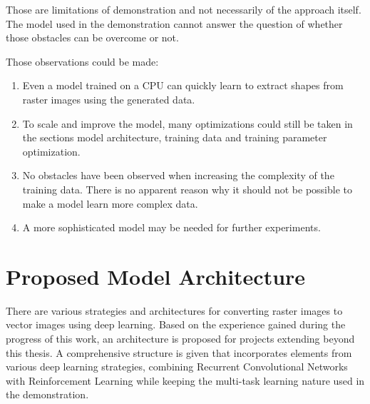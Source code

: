\documentclass[12pt, a4paper, titlepage]{report}
\begin{document}
\vspace{0.5cm}
Those are limitations of demonstration and not necessarily of the approach itself. The model used in the demonstration cannot answer the question of whether those obstacles can be overcome or not.

Those observations could be made:

\begin{enumerate}[label=\Roman*.]
   \item Even a model trained on a CPU can quickly learn to extract shapes from raster images using the generated data.
   \item To scale and improve the model, many optimizations could still be taken in the sections model architecture, training data and training parameter optimization.
   \item No obstacles have been observed when increasing the complexity of the training data. There is no apparent reason why it should not be possible to make a model learn more complex data.
   \item A more sophisticated model may be needed for further experiments.
\end{enumerate}



\section{Proposed Model Architecture}

There are various strategies and architectures for converting raster images to vector images using deep learning. Based on the experience gained during the progress of this work, an architecture is proposed for projects extending beyond this thesis. A comprehensive structure is given that incorporates elements from various deep learning strategies, combining Recurrent Convolutional Networks with Reinforcement Learning while keeping the multi-task learning nature used in the demonstration.
\end{document}
